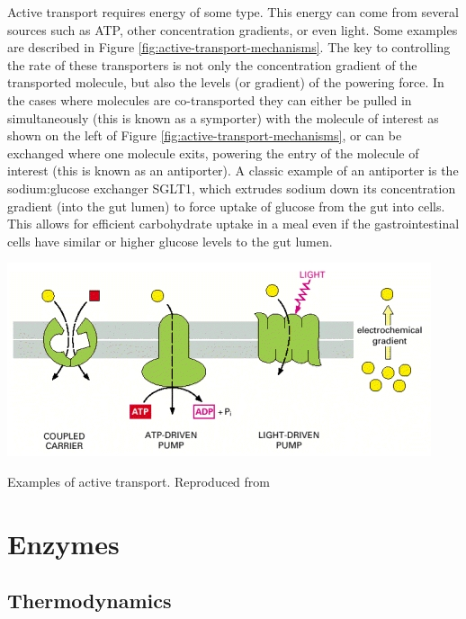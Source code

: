 \documentclass{tufte-handout}
\begin{document}
Active transport requires energy of some type.  This energy can come from several sources such as ATP, other concentration gradients, or even light.  Some examples are described in Figure \ref{fig:active-transport-mechanisms}.  The key to controlling the rate of these transporters is not only the concentration gradient of the transported molecule, but also the levels (or gradient) of the powering force.  In the cases where molecules are co-transported they can either be pulled in simultaneously (this is known as a symporter) with the molecule of interest as shown on the left of Figure \ref{fig:active-transport-mechanisms}, or can be exchanged where one molecule exits, powering the entry of the molecule of interest (this is known as an antiporter).  A classic example of an antiporter is the sodium:glucose exchanger SGLT1, which extrudes sodium down its concentration gradient (into the gut lumen) to force uptake of glucose from the gut into cells.  This allows for efficient carbohydrate uptake in a meal even if the gastrointestinal cells have similar or higher glucose levels to the gut lumen.

\begin{marginfigure}
\includegraphics{figures/active-transport-mechanisms.jpg}\
\caption{Examples of active transport.  Reproduced from \citet{Alberts2002a}}
\label{fig:active-transport-mechanisms}
\end{marginfigure}

\section{Enzymes}

\subsection{Thermodynamics}
\end{document}
